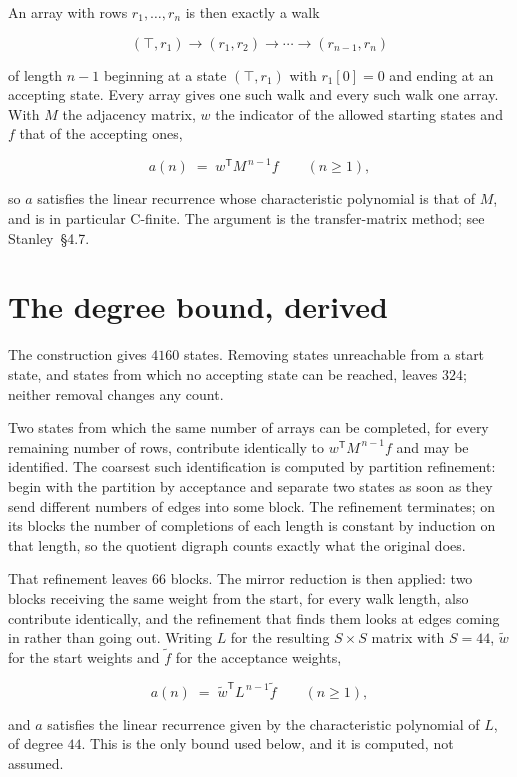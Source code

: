 \documentclass[11pt]{article}
\theoremstyle{definition}
\begin{document}
An array with rows $r_1,\dots,r_n$ is then exactly a walk

\[(\top,r_1) \to (r_1,r_2) \to \cdots \to (r_{n-1},r_n)\]

of length $n-1$ beginning at a state $(\top,r_1)$ with $r_1[0]=0$ and ending at an accepting state. Every array gives one such walk and every such walk one array. With $M$ the adjacency matrix, $w$ the indicator of the allowed starting states and $f$ that of the accepting ones,

\[a(n) \;=\; w^{\mathsf T} M^{\,n-1} f \qquad (n \ge 1),\]

so $a$ satisfies the linear recurrence whose characteristic polynomial is that of $M$, and is in particular C-finite. The argument is the transfer-matrix method; see Stanley~\S4.7.

\section{The degree bound, derived}

The construction gives $4160$ states. Removing states unreachable from a start state, and states from which no accepting state can be reached, leaves $324$; neither removal changes any count.

Two states from which the same number of arrays can be completed, for every remaining number of rows, contribute identically to $w^{\mathsf T}M^{\,n-1}f$ and may be identified. The coarsest such identification is computed by partition refinement: begin with the partition by acceptance and separate two states as soon as they send different numbers of edges into some block. The refinement terminates; on its blocks the number of completions of each length is constant by induction on that length, so the quotient digraph counts exactly what the original does.

That refinement leaves $66$ blocks. The mirror reduction is then applied: two blocks receiving the same weight from the start, for every walk length, also contribute identically, and the refinement that finds them looks at edges coming in rather than going out. Writing $L$ for the resulting $S \times S$ matrix with $S = 44$, $\tilde w$ for the start weights and $\tilde f$ for the acceptance weights,

\[a(n) \;=\; \tilde w^{\mathsf T} L^{\,n-1} \tilde f \qquad (n \ge 1),\]

and $a$ satisfies the linear recurrence given by the characteristic polynomial of $L$, of degree $44$. This is the only bound used below, and it is computed, not assumed.
\end{document}
